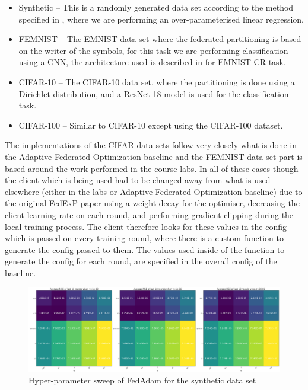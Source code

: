 \documentclass{article}
\begin{document}
\begin{itemize}
    \item Synthetic -- This is a randomly generated data set according to the method specified in \cite{syntheticDatasetGeneration}, where we are performing an over-parameterised linear regression.
    \item FEMNIST -- The EMNIST data set where the federated partitioning is based on the writer of the symbols, for this task we are performing classification using a CNN, the architecture used is described in \cite{AdaptiveFederatedOptimisation} for EMNIST CR task.
    \item CIFAR-10 -- The CIFAR-10 data set, where the partitioning is done using a Dirichlet distribution, and a ResNet-18 model \cite{ResNet} is used for the classification task.
    \item CIFAR-100 -- Similar to CIFAR-10 except using the CIFAR-100 dataset.
\end{itemize}

The implementations of the CIFAR data sets follow very closely what is done in the Adaptive Federated Optimization baseline and the FEMNIST data set part is based around the work performed in the course labs.  In all of these cases though the client which is being used had to be changed away from what is used elsewhere (either in the labs or Adaptive Federated Optimization baseline) due to the original FedExP paper \cite{FedExP} using a weight decay for the optimiser, decreasing the client learning rate on each round, and performing gradient clipping during the local training process.  The client therefore looks for these values in the config which is passed on every training round, where there is a custom function to generate the config passed to them.  The values used inside of the function to generate the config for each round, are specified in the overall config of the baseline.

\begin{figure}
    \centerline{\includegraphics[width=\linewidth]{figs/fedAdamSyntheticHyperpameterTuning.png}}
    \caption{Hyper-parameter sweep of FedAdam for the synthetic data set}
    \label{fig:fedAdamSweep}
\end{figure}
\end{document}
